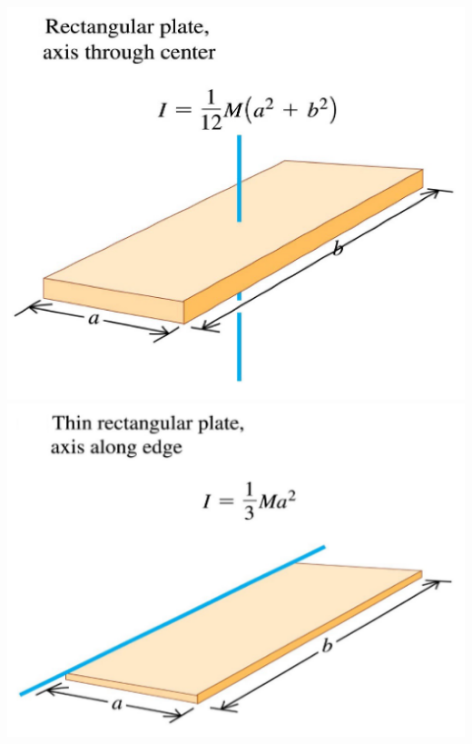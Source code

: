 \documentclass[10pt,landscape,a4paper]{article}
\begin{document}
\begin{multicols*}{5}
  \includegraphics[width = 0.74\linewidth]{rectangular-plate-moi-1}
  \includegraphics[width = 0.74\linewidth]{rectangular-plate-moi-2}


\end{multicols*}
\end{document}
